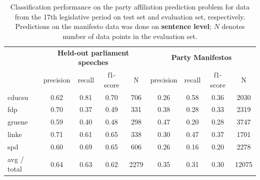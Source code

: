 \documentclass{article}
\begin{document}
\begin{table}[t]
\caption{
\label{tab:results_17}
Classification performance on the party affiliation prediction problem for data from the 17th legislative period on test set and evaluation set, respectively. Predictions on the manifesto data was done on {\bf sentence level}; $N$ denotes number of data points in the evaluation set.
}
\begin{center}
\begin{tabular}{lcccccccc}
& \multicolumn{4}{c}{\bf Held-out parliament speeches} & \multicolumn{4}{c}{\bf Party Manifestos}\\
    &         precision    &recall &  f1-score  & N    &         precision    &recall &  f1-score  & N\\
\hline \hline
       cducsu   &    0.62  &    0.81  &    0.70  &     706&0.26    &  0.58   &   0.36    &  2030\\
        fdp    &   0.70   &   0.37  &    0.49    &   331&0.38   &   0.28    &  0.33   &   2319\\
     gruene &      0.59  &    0.40   &   0.48   &    298&0.47  &    0.20   &   0.28 &     3747\\
      linke    &   0.71   &   0.61  &    0.65    &   338&0.30   &   0.47   &   0.37    &  1701\\
        spd   &    0.60   &   0.69  &    0.65   &    606&0.26   &   0.16   &   0.20  &    2278\\
\hline
avg / total &      0.64   &   0.63   &   0.62    &  2279 &0.35    &  0.31 &     0.30   &  12075
%
\end{tabular}
\end{center}
\end{table}
\end{document}
